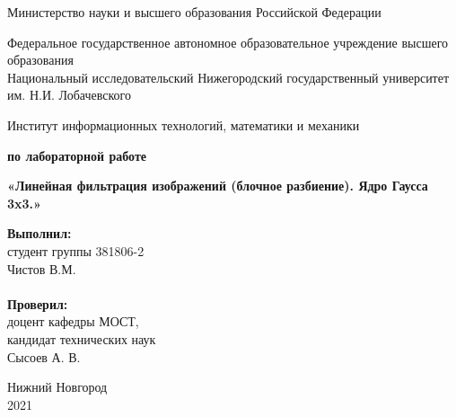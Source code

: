 \documentclass{report}
\begin{document}
\begin{titlepage}

\begin{center}
Министерство науки и высшего образования Российской Федерации
\end{center}

\begin{center}
Федеральное государственное автономное образовательное учреждение высшего образования \\
Национальный исследовательский Нижегородский государственный университет им. Н.И. Лобачевского
\end{center}

\begin{center}
Институт информационных технологий, математики и механики
\end{center}

\vspace{4em}

\begin{center}
\textbf{ по лабораторной работе} \\
\end{center}
\begin{center}
\textbf{\Large«Линейная фильтрация изображений (блочное разбиение). Ядро Гаусса 3x3.»} \\
\end{center}

\vspace{4em}

\newbox{\lbox}
\newlength{\maxl}
\setlength{\maxl}{\wd\lbox}
\hfill\parbox{7cm}{
\hspace*{5cm}\hspace*{-5cm}\textbf{Выполнил:} \\ студент группы 381806-2 \\ Чистов В.М.\\
\\
\hspace*{5cm}\hspace*{-5cm}\textbf{Проверил:}\\ доцент кафедры МОСТ, \\ кандидат технических наук \\ Сысоев А. В.\\
}
\vspace{\fill}

\begin{center} Нижний Новгород \\ 2021 \end{center}

\end{titlepage}
\end{document}
